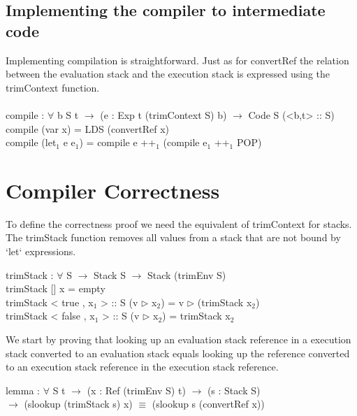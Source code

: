\documentclass[paper=a4, fontsize=11pt]{scrartcl} %
\numberwithin{equation}{section} %
\numberwithin{figure}{section} %
\numberwithin{table}{section} %
\begin{document}
\subsection{Implementing the compiler to intermediate code}
Implementing compilation is straightforward. Just as for \ttfamily convertRef \normalfont the relation between the evaluation stack and the execution stack is expressed using the trimContext function. \\
\\
\ttfamily
compile : $\forall$ {b S t} $\rightarrow$ (e : Exp t (trimContext S) b) $\rightarrow$ Code S (<b,t> :: S)\\
compile (var x) = LDS (convertRef x)\\
compile (let$_1$ e e$_1$) = compile e ++$_1$ (compile e$_1$ ++$_1$ POP)\\
\normalfont

\section{Compiler Correctness}
To define the correctness proof we need the equivalent of \ttfamily trimContext \normalfont for stacks. The \ttfamily trimStack \normalfont function removes all values from a stack that are not bound by `let` expressions.\\
\ttfamily

trimStack : $\forall$ {S} $\rightarrow$ Stack S $\rightarrow$ Stack (trimEnv S)\\
trimStack {[]} x = empty\\
trimStack {< true , x$_1$ > :: S} (v $\rhd$ x$_2$) = v $\rhd$ (trimStack x$_2$)\\
trimStack {< false , x$_1$ > :: S} (v $\rhd$ x$_2$) = trimStack x$_2$\\

\normalfont

We start by proving that looking up an evaluation stack reference in a execution stack converted to an evaluation stack equals looking up the reference converted to an execution stack reference in the execution stack reference.\\
\ttfamily

lemma : $\forall$ {S t} $\rightarrow$ (x : Ref (trimEnv S) t) $\rightarrow$ (s : Stack S)\\
\hspace*{30mm}$\rightarrow$ (slookup (trimStack s) x) $\equiv$ (slookup s (convertRef x))\\
\end{document}
